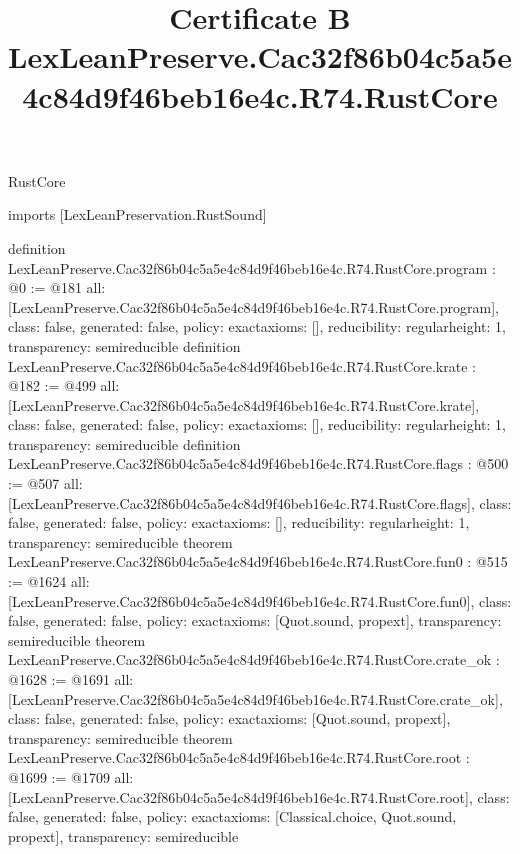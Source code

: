 \begin{lexlean}{RustCore}
\title{Certificate B LexLeanPreserve.Cac32f86b04c5a5e4c84d9f46beb16e4c.R74.RustCore}
\begin{coremodule}
imports [LexLeanPreservation.RustSound]

definition LexLeanPreserve.Cac32f86b04c5a5e4c84d9f46beb16e4c.R74.RustCore.program : @0 := @181 {
  all: [LexLeanPreserve.Cac32f86b04c5a5e4c84d9f46beb16e4c.R74.RustCore.program],
  class: false,
  generated: false,
  policy: exact{axioms: []},
  reducibility: regular{height: 1},
  transparency: semireducible
}
definition LexLeanPreserve.Cac32f86b04c5a5e4c84d9f46beb16e4c.R74.RustCore.krate : @182 := @499 {
  all: [LexLeanPreserve.Cac32f86b04c5a5e4c84d9f46beb16e4c.R74.RustCore.krate],
  class: false,
  generated: false,
  policy: exact{axioms: []},
  reducibility: regular{height: 1},
  transparency: semireducible
}
definition LexLeanPreserve.Cac32f86b04c5a5e4c84d9f46beb16e4c.R74.RustCore.flags : @500 := @507 {
  all: [LexLeanPreserve.Cac32f86b04c5a5e4c84d9f46beb16e4c.R74.RustCore.flags],
  class: false,
  generated: false,
  policy: exact{axioms: []},
  reducibility: regular{height: 1},
  transparency: semireducible
}
theorem LexLeanPreserve.Cac32f86b04c5a5e4c84d9f46beb16e4c.R74.RustCore.fun0 : @515 := @1624 {
  all: [LexLeanPreserve.Cac32f86b04c5a5e4c84d9f46beb16e4c.R74.RustCore.fun0],
  class: false,
  generated: false,
  policy: exact{axioms: [Quot.sound, propext]},
  transparency: semireducible
}
theorem LexLeanPreserve.Cac32f86b04c5a5e4c84d9f46beb16e4c.R74.RustCore.crate_ok : @1628 := @1691 {
  all: [LexLeanPreserve.Cac32f86b04c5a5e4c84d9f46beb16e4c.R74.RustCore.crate_ok],
  class: false,
  generated: false,
  policy: exact{axioms: [Quot.sound, propext]},
  transparency: semireducible
}
theorem LexLeanPreserve.Cac32f86b04c5a5e4c84d9f46beb16e4c.R74.RustCore.root : @1699 := @1709 {
  all: [LexLeanPreserve.Cac32f86b04c5a5e4c84d9f46beb16e4c.R74.RustCore.root],
  class: false,
  generated: false,
  policy: exact{axioms: [Classical.choice, Quot.sound, propext]},
  transparency: semireducible
}


\end{coremodule}
\end{lexlean}
